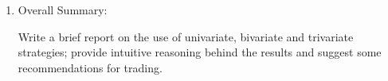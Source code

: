 \documentclass[12pt]{article}
\begin{document}
\begin{enumerate}
\item {Overall Summary:}

Write a brief report on the use of univariate, bivariate and trivariate strategies; provide intuitive reasoning behind the results and suggest some recommendations for trading.


%
%
%
%
%
\end{enumerate}
\end{document}
